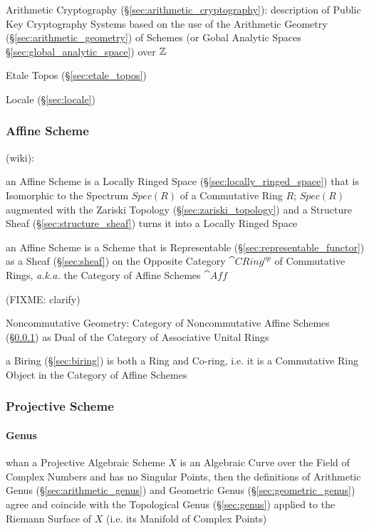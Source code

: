 \fist Arithmetic Cryptography (\S\ref{sec:arithmetic_cryptography}):
description of Public Key Cryptography Systems based on the use of the
Arithmetic Geometry (\S\ref{sec:arithmetic_geometry}) of Schemes (or Gobal
Analytic Spaces \S\ref{sec:global_analytic_space}) over $\mathbb{Z}$

Etale Topos (\S\ref{sec:etale_topos})

Locale (\S\ref{sec:locale})



\subsubsection{Affine Scheme}\label{sec:affine_scheme}

(wiki):

an Affine Scheme is a Locally Ringed Space (\S\ref{sec:locally_ringed_space})
that is Isomorphic to the Spectrum $Spec(R)$ of a Commutative Ring $R$;
$Spec(R)$ augmented with the Zariski Topology (\S\ref{sec:zariski_topology}) and
a Structure Sheaf (\S\ref{sec:structure_sheaf}) turns it into a Locally Ringed
Space

an Affine Scheme is a Scheme that is Representable
(\S\ref{sec:representable_functor}) as a Sheaf (\S\ref{sec:sheaf}) on the
Opposite Category $\cat{CRing}^{op}$ of Commutative Rings, \emph{a.k.a.} the
Category of Affine Schemes $\cat{Aff}$

(FIXME: clarify)

Noncommutative Geometry: Category of Noncommutative Affine Schemes
(\S\ref{sec:affine_scheme}) as Dual of the Category of Associative Unital Rings

a Biring (\S\ref{sec:biring}) is both a Ring and Co-ring, i.e. it is a
Commutative Ring Object in the Category of Affine Schemes



\subsubsection{Projective Scheme}\label{sec:projective_scheme}

\paragraph{Genus}\label{sec:scheme_genus}\hfill

whan a Projective Algebraic Scheme $X$ is an Algebraic Curve over the Field of
Complex Numbers and has no Singular Points, then the definitions of Arithmetic
Genus (\S\ref{sec:arithmetic_genus}) and Geometric Genus
(\S\ref{sec:geometric_genus}) agree and coincide with the Topological
Genus (\S\ref{sec:genus}) applied to the Riemann Surface of $X$ (i.e. its
Manifold of Complex Points)

